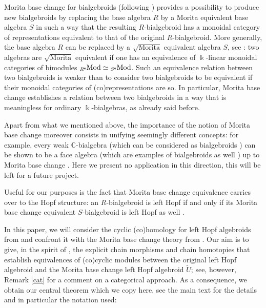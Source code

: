 \documentclass[reqno, a4paper, 10pt]{amsart}
\numberwithin{equation}{section}
\theoremstyle{plain}
\theoremstyle{definition}
\theoremstyle{remark}
\begin{document}
Morita base change for bialgebroids (following \cite{Schau:MBCIQG}) provides a possibility to produce new bialgebroids by replacing the base algebra $R$ by a Morita equivalent base algebra $S$ in such a way that the resulting $R$-bialgebroid has a monoidal category of representations equivalent to that of the original $R$-bialgebroid. More generally, the base algebra $R$ can be replaced by a $\sqrt{\mbox{Morita}}$ equivalent algebra $S$, see \cite{Tak:squareMorita}: two algebras are $\sqrt{\mbox{Morita}}$ equivalent if one has an equivalence of ${{\Bbbk}}$-linear monoidal categories of bimodules $ {}_{R^{{\mathsf{{e}}}}}{\rm Mod}  \simeq {}_{S^{{\mathsf{{e}}}}}{\rm Mod}$.
Such an equivalence relation between two bialgebroids is weaker than to consider two bialgebroids to be equivalent if their monoidal categories of (co)representations are so. In particular, Morita base change establishes a relation between two bialgebroids
  in a way that is meaningless for ordinary ${{\Bbbk}}$-bialgebras, as already
said before.

Apart from what we mentioned above, the importance of the notion of Morita base change moreover consists in unifying seemingly different concepts: for example, every weak ${{\mathbb{C}}}$-bialgebra (which can be considered as bialgebroids \cite[\S3.2.2]{Boe:HA}) can be shown to be a face algebra (which are examples of 
bialgebroids as well \cite{Schau:FAATRB}) up to Morita base change \cite[\S5.2]{Schau:MBCIQG}. Here we present no application in this direction, this will be left for a future project.

Useful for our purposes is the fact that Morita base change equivalence carries over to the 
Hopf structure: an $R$-bialgebroid is left Hopf if and only if its Morita base change equivalent $S$-bialgebroid is left Hopf as well \cite[Prop.~4.6]{Schau:MBCIQG}.

In this paper, we will consider  the cyclic (co)homology for left Hopf algebroids from \cite{KowKra:CSIACT} and confront it with the Morita base change theory from \cite{Schau:MBCIQG}. Our aim is to give, in the spirit of \cite{McC:MEACH}, the explicit chain morphisms and chain homotopies that establish equivalences of (co)cyclic modules between the original left Hopf algebroid and the Morita base change left Hopf algebroid ${\tilde{{U}}}$; see, however, Remark \ref{cat} for a comment on a categorical approach. 
As a consequence, we obtain our central theorem which we copy here, see the main text for the details and in particular the notation used:
\end{document}
